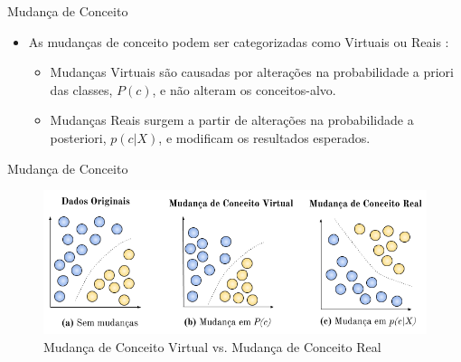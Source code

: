 \documentclass[10pt]{beamer}
\begin{document}
\begin{frame}{Mudança de Conceito}
    \begin{itemize}
        \item<1 -> As mudanças de conceito podem ser categorizadas como \alert{Virtuais} ou \alert{Reais} \cite{Gama:2014:SCD:2597757.2523813}:
        \begin{itemize}
        \item<1 -> \alert{Mudanças Virtuais} são causadas por alterações na probabilidade a priori das classes, $P(c)$, e não alteram os conceitos-alvo.
        \item<1 -> \alert{Mudanças Reais} surgem a partir de alterações na probabilidade a posteriori, $p(c|X)$, e modificam os resultados esperados.
        \end{itemize}
    \end{itemize}
\end{frame}

\begin{frame}{Mudança de Conceito}
\begin{figure}[H]
    \begin{center}
        \includegraphics[scale=0.5]{imagens/concept_drift.png}
        \caption{Mudança de Conceito Virtual vs. Mudança de Conceito Real}
        \label{fig:real_and_virtual_concept_drift}
    \end{center}
\end{figure}
\end{frame}
\end{document}
